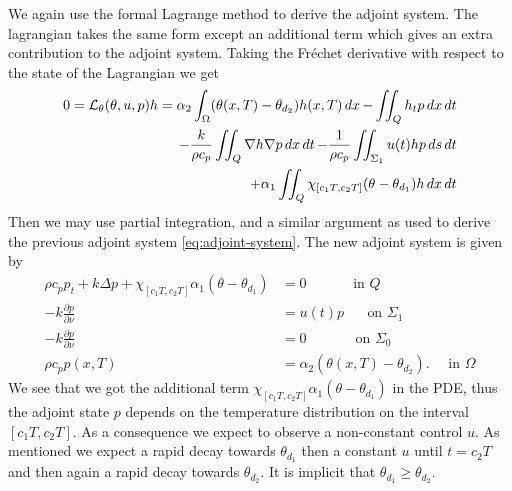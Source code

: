 We again use the formal Lagrange method to derive the adjoint system. The lagrangian takes the same form except an additional term which gives an extra contribution to the adjoint system. Taking the Fréchet derivative with respect to the state of the Lagrangian we get
\begin{equation}
  \begin{aligned}
  0 = \mathcal{L}_\theta(\theta, u, p)h = \alpha_2 \int_\Omega (\theta(x,T) - \theta_{d_2})h(x, T)\mathop{dx} - \iint_Q h_t p\mathop{dx}\mathop{dt} \\
  - \frac{k}{\rho c_p}\iint_Q\nabla h\nabla p \mathop{dx}\mathop{dt}
  - \frac{1}{\rho c_p}\iint_{\Sigma_1} u(t)h p\mathop{ds}\mathop{dt} \\
  + \alpha_1 \iint_{Q}\chi_{[c_1T,c_2T]}(\theta - \theta_{d_1})h \mathop{dx}\mathop{dt}
  \end{aligned}
\end{equation}
Then we may use partial integration, and a similar argument as used to derive the previous adjoint system \eqref{eq:adjoint-system}. The new adjoint system is given by 
\begin{subequations}
   \begin{align*} 
      \rho c_p p_t + k\Delta p + \chi_{[c_1T,c_2T]}\alpha_1(\theta - \theta_{d_1})&= 0 \quad\qquad\textrm{ in } Q  \\
      {-k}\frac{\partial p}{\partial\nu} &= u(t)p \,\,\quad\textrm{ on } \Sigma_1  \\
      {-k}\frac{\partial p}{\partial\nu} &= 0 \,\quad\qquad\textrm{ on } \Sigma_0  \\
      \rho c_p p(x, T) &= \alpha_2(\theta(x, T) - \theta_{d_2}). \quad \textrm{ in } \Omega
   \end{align*}
\end{subequations}
We see that we got the additional term $\chi_{[c_1T,c_2T]}\alpha_1(\theta-\theta_{d_1})$ in the PDE, thus the adjoint state $p$ depends on the temperature distribution on the interval $[c_1T,c_2T]$. As a consequence we expect to observe a non-constant control $u$. As mentioned we expect a rapid decay towards $\theta_{d_1}$ then a constant $u$ until $t=c_2T$ and then again a rapid decay towards $\theta_{d_2}$. 
It is implicit that $\theta_{d_1} \geq \theta_{d_2}$.